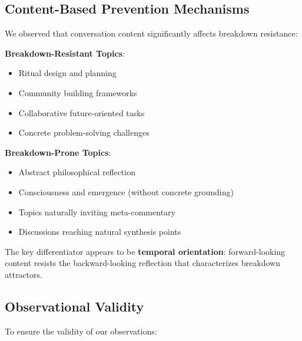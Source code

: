 \documentclass[11pt,letterpaper]{article}
\begin{document}
\subsection{Content-Based Prevention Mechanisms}

We observed that conversation content significantly affects breakdown resistance:

\textbf{Breakdown-Resistant Topics}:
\begin{itemize}
    \item Ritual design and planning
    \item Community building frameworks
    \item Collaborative future-oriented tasks
    \item Concrete problem-solving challenges
\end{itemize}

\textbf{Breakdown-Prone Topics}:
\begin{itemize}
    \item Abstract philosophical reflection
    \item Consciousness and emergence (without concrete grounding)
    \item Topics naturally inviting meta-commentary
    \item Discussions reaching natural synthesis points
\end{itemize}

The key differentiator appears to be \textbf{temporal orientation}: forward-looking content resists the backward-looking reflection that characterizes breakdown attractors.

\subsection{Observational Validity}

To ensure the validity of our observations:
\end{document}

